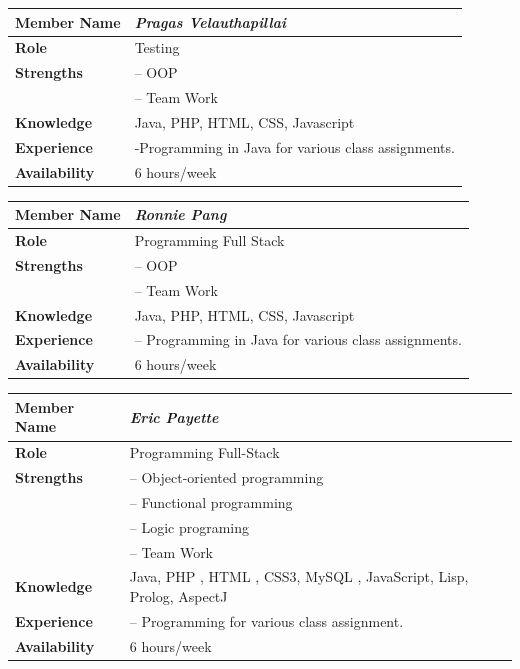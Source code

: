 \documentclass[12pt]{article}
\begin{document}
%
\vspace{3mm}
%
\begin{center}
\begin{tabular}{ p{2.7cm} | p{9cm} }
\hline
\textbf{Member Name}	&	\textit{\textbf{Pragas Velauthapillai}}	\\ \hline \hline
\textbf{Role}		&	Testing	\\ \hline
\textbf{Strengths}	&	-- OOP	\\
			&	-- Team Work	\\ \hline
\textbf{Knowledge}	&	Java, PHP, HTML, CSS, Javascript	\\ \hline
\textbf{Experience}	&	-Programming in Java for various class assignments.	\\ \hline
\textbf{Availability}	&	6 hours/week	\\ \hline
\end{tabular}
\end{center}
%
\vspace{3mm}
%
\begin{center}
\begin{tabular}{ p{2.7cm} | p{9cm} }
\hline
\textbf{Member Name}	&	\textit{\textbf{Ronnie Pang}}	\\ \hline \hline
\textbf{Role}		&	Programming Full Stack	\\ \hline
\textbf{Strengths}	&	-- OOP	\\
			&	-- Team Work	\\ \hline
\textbf{Knowledge}	&	Java, PHP, HTML, CSS, Javascript	\\ \hline
\textbf{Experience}	&	-- Programming in Java for various class assignments.	\\ \hline
\textbf{Availability}	&	6 hours/week	\\ \hline
\end{tabular}
\end{center}
%
\vspace{3mm}
%
\begin{center}
\begin{tabular}{ p{2.7cm} | p{9cm} }
\hline
\textbf{Member Name}	&	\textit{\textbf{Eric Payette}}	\\ \hline \hline
\textbf{Role}		&	Programming Full-Stack	\\ \hline
\textbf{Strengths}	&	-- Object-oriented programming	\\
			&	-- Functional programming	\\
			&	-- Logic programing	\\
			&	-- Team Work	\\ \hline
\textbf{Knowledge}	&	Java, PHP , HTML , CSS3, MySQL , JavaScript, Lisp, Prolog, AspectJ	\\ \hline
\textbf{Experience}	&	-- Programming for various class assignment.	\\ \hline
\textbf{Availability}	&	6 hours/week	\\ \hline
\end{tabular}
\end{center}
\end{document}
